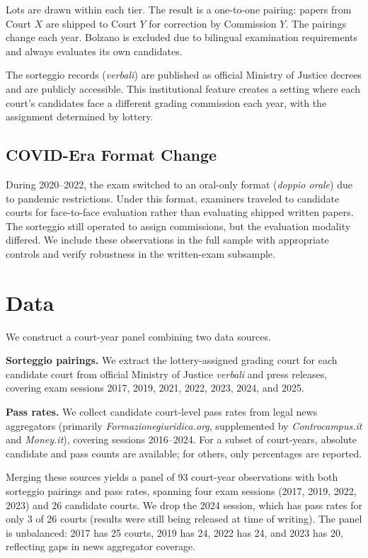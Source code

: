 \documentclass[11pt]{article}
\begin{document}
Lots are drawn within each tier. The result is a one-to-one pairing: papers from Court $X$ are shipped to Court $Y$ for correction by Commission $Y$. The pairings change each year. Bolzano is excluded due to bilingual examination requirements and always evaluates its own candidates.

The sorteggio records (\textit{verbali}) are published as official Ministry of Justice decrees and are publicly accessible. This institutional feature creates a setting where each court's candidates face a different grading commission each year, with the assignment determined by lottery.

\subsection{COVID-Era Format Change}

During 2020--2022, the exam switched to an oral-only format (\textit{doppio orale}) due to pandemic restrictions. Under this format, examiners traveled to candidate courts for face-to-face evaluation rather than evaluating shipped written papers. The sorteggio still operated to assign commissions, but the evaluation modality differed. We include these observations in the full sample with appropriate controls and verify robustness in the written-exam subsample.

\section{Data} \label{sec:data}

We construct a court-year panel combining two data sources.

\textbf{Sorteggio pairings.} We extract the lottery-assigned grading court for each candidate court from official Ministry of Justice \textit{verbali} and press releases, covering exam sessions 2017, 2019, 2021, 2022, 2023, 2024, and 2025.

\textbf{Pass rates.} We collect candidate court-level pass rates from legal news aggregators (primarily \textit{Formazionegiuridica.org}, supplemented by \textit{Controcampus.it} and \textit{Money.it}), covering sessions 2016--2024. For a subset of court-years, absolute candidate and pass counts are available; for others, only percentages are reported.

Merging these sources yields a panel of 93 court-year observations with both sorteggio pairings and pass rates, spanning four exam sessions (2017, 2019, 2022, 2023) and 26 candidate courts. We drop the 2024 session, which has pass rates for only 3 of 26 courts (results were still being released at time of writing). The panel is unbalanced: 2017 has 25 courts, 2019 has 24, 2022 has 24, and 2023 has 20, reflecting gaps in news aggregator coverage.
\end{document}
